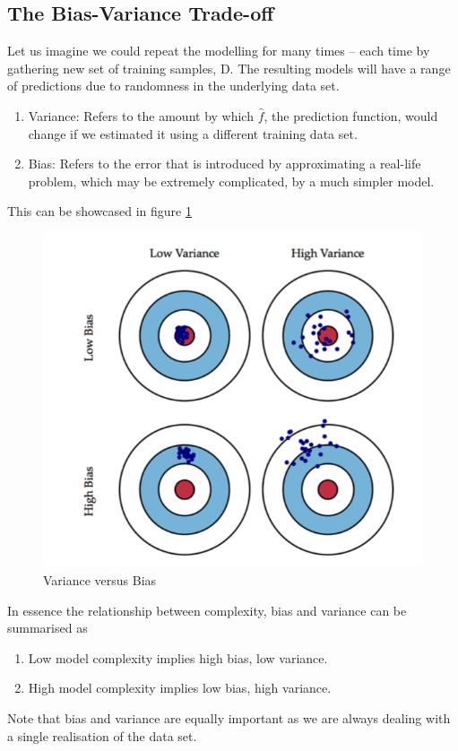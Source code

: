 \documentclass[12pt]{article}
\numberwithin{equation}{section}
\begin{document}
\subsection{The Bias-Variance Trade-off}
Let us imagine we could repeat the modelling for many times – each time by gathering new set of training samples, D. The resulting models will have a range of predictions due to randomness in the underlying data set.
\begin{enumerate}
    \item Variance: Refers to the amount by which $\hat{f}$, the prediction function, would change if we estimated it using a different training data set.
    \item Bias: Refers to the error that is introduced by approximating a real-life problem, which may be extremely complicated, by a much simpler model.
\end{enumerate}
This can be showcased in figure \ref{var_bias}
\begin{figure}[!ht]
    \centering
    \includegraphics[scale = 0.7]{var_bias.png}
    \caption{Variance versus Bias}
    \label{var_bias}
\end{figure}
In essence the relationship between complexity, bias and variance can be summarised as
\begin{enumerate}
    \item Low model complexity implies high bias, low variance.
    \item High model complexity implies low bias, high variance.
\end{enumerate}
Note that bias and variance are equally important as we are always dealing with a single realisation of the data set.
\end{document}
